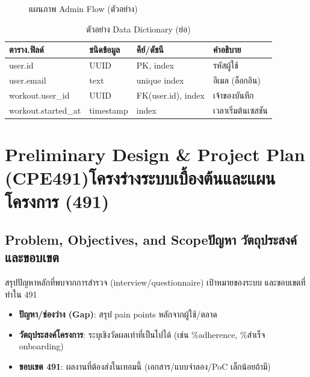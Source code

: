 \begin{figure}[h]
  \centering
  \caption{แผนภาพ Admin Flow (ตัวอย่าง)}
  \label{fig:adminflow}
\end{figure}

\begin{table}[h]
\centering
\begin{tabular}{@{}llll@{}}
\toprule
\textbf{ตาราง.ฟิลด์} & \textbf{ชนิดข้อมูล} & \textbf{คีย์/ดัชนี} & \textbf{คำอธิบาย} \\
\midrule
user.id & UUID & PK, index & รหัสผู้ใช้ \\
user.email & text & unique index & อีเมล (ล็อกอิน) \\
workout.user\_id & UUID & FK(user.id), index & เจ้าของบันทึก \\
workout.started\_at & timestamp & index & เวลาเริ่มต้นเซสชัน \\
\bottomrule
\end{tabular}
\caption{ตัวอย่าง Data Dictionary (ย่อ)}
\label{tab:data-dict-app}
\end{table}

\chapter{\ifenglish Preliminary Design \& Project Plan (CPE491)\else โครงร่างระบบเบื้องต้นและแผนโครงการ (491)\fi}
\label{app:prelim-plan}

\section{\ifenglish Problem, Objectives, and Scope\else ปัญหา วัตถุประสงค์ และขอบเขต\fi}
สรุปปัญหาหลักที่พบจากการสำรวจ (interview/questionnaire) เป้าหมายของระบบ และขอบเขตที่ทำใน 491
\begin{itemize}
  \item \textbf{ปัญหา/ช่องว่าง (Gap)}: สรุป pain points หลักจากผู้ใช้/ตลาด
  \item \textbf{วัตถุประสงค์โครงการ}: ระบุเชิงวัดผลเท่าที่เป็นไปได้ (เช่น \%adherence, \%สำเร็จ onboarding)
  \item \textbf{ขอบเขต 491}: ผลงานที่ต้องส่งในเทอมนี้ (เอกสาร/แบบจำลอง/PoC เล็กน้อยถ้ามี)
\end{itemize}

